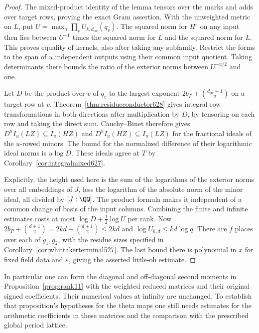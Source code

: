 \documentclass[a4paper,11pt]{article}
\theoremstyle{definition}
\theoremstyle{remark}
\numberwithin{equation}{section}
\begin{document}
\begin{proof}
The mixed-product identity of the lemma tensors over the marks
and adds over target rows, proving the exact Gram assertion.
With the unweighted metric on \(L\), put
\(U=\max_\alpha\prod_v U_{k,d_{\alpha v}}(q_v)\).
The squared norm for \(H^\circ\) on any input then lies between
\(U^{-1}\) times the squared norm for \(L\) and the squared norm
for \(L\). This proves equality of kernels, also after taking
any subfamily. Restrict the forms to the span of \(u\) independent
outputs using their common input quotient. Taking determinants
there bounds the ratio of the exterior norms between
\(U^{-u/2}\) and one.

Let \(D\) be the product over \(v\) of \(q_v\) to the largest
exponent \(2b_P+\binom{d_{\alpha v}+1}2\) on a target row at \(v\).
Theorem~\ref{thm:residueconductor628} gives integral row
transformations in both directions after multiplication by \(D\),
by tensoring on each row and taking the direct sum.
Cauchy--Binet therefore gives \(D^u I_u(LZ)\subseteq I_u(HZ)\)
and \(D^u I_u(HZ)\subseteq I_u(LZ)\) for the fractional ideals
of the \(u\)-rowed minors. The bound for the normalized difference
of their logarithmic ideal norms is \(u\log D\). These ideals agree
at \(T\) by Corollary~\ref{cor:integralmixed627}.

Explicitly, the height used here is the sum of the logarithms
of the exterior norms over all embeddings of \(J\), less the
logarithm of the absolute norm of the minor ideal, all divided
by \([J:\QQ]\). The product formula makes it independent of a
common change of basis of the input columns. Combining the finite
and infinite estimates costs at most \(\log D+\tfrac12\log U\)
per rank. Now \(2b_P+\binom{d+1}2=2kd-\binom{d+1}2\le 2kd\)
and \(\log U_{k,d}\le kd\log q\).
There are \(f\) places over each of \(g_1,g_2\), with the residue
sizes specified in Corollary~\ref{cor:whittakerterminal527}.
The last bound there is polynomial in \(x\) for fixed field
data and \(\varepsilon\), giving the asserted little-oh estimate.
\end{proof}

In particular one can form the diagonal and off-diagonal second
moments in Proposition~\ref{prop:rank11} with the weighted reduced
matrices and their original signed coefficients. Their numerical
values at infinity are unchanged. To establish that proposition's
hypotheses for the theta maps one still needs estimates for the
arithmetic coefficients in these matrices and the comparison with
the prescribed global period lattice.
\end{document}
